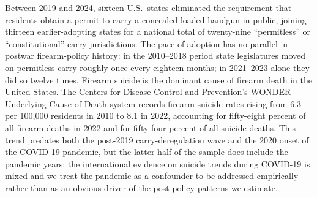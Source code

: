 \documentclass[12pt]{article}
\begin{document}
Between 2019 and 2024, sixteen U.S.\ states eliminated the requirement
that residents obtain a permit to carry a concealed loaded handgun in
public, joining thirteen earlier-adopting states for a national total
of twenty-nine ``permitless'' or ``constitutional'' carry
jurisdictions. The pace of adoption has no parallel in postwar
firearm-policy history: in the 2010--2018 period state legislatures
moved on permitless carry roughly once every eighteen months; in
2021--2023 alone they did so twelve times. Firearm suicide is the
dominant cause of firearm death in the United States. The Centers
for Disease Control and Prevention's WONDER Underlying Cause of
Death system \citep{cdcwonder} records firearm suicide rates rising
from 6.3 per 100,000 residents in 2010 to 8.1 in 2022, accounting
for fifty-eight percent of all firearm deaths in 2022 and for
fifty-four percent of all suicide deaths. This trend predates both
the post-2019 carry-deregulation wave and the 2020 onset of the
COVID-19 pandemic, but the latter half of the sample does include
the pandemic years; the international evidence on suicide trends
during COVID-19 is mixed and we treat the pandemic as a confounder
to be addressed empirically rather than as an obvious driver of
the post-policy patterns we estimate.
\end{document}
